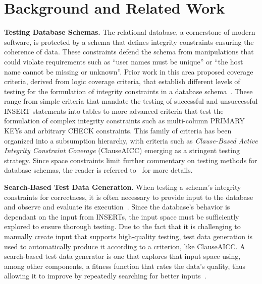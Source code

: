 
\vspace*{-.05in}
\section{Background and Related Work}
\vspace*{-.05in}




{\bf Testing Database Schemas.} The relational database, a cornerstone of modern software, is protected by a schema that
defines integrity constraints ensuring the coherence of data. These constraints defend the schema from manipulations
that could violate requirements such as ``user names must be unique'' or ``the host name cannot be missing or unknown''.
Prior work in this area proposed coverage criteria, derived from logic coverage criteria, that establish different
levels of testing for the formulation of integrity constraints in a database schema~\cite{mcminn2015}. These range from
simple criteria that mandate the testing of successful and unsuccessful INSERT statements into tables to more advanced
criteria that test the formulation of complex integrity constraints such as multi-column PRIMARY KEYs and arbitrary
CHECK constraints. This family of criteria has been organized into a subsumption hierarchy, with criteria such as {\em
Clause-Based Active Integrity Constraint Coverage} (ClauseAICC) emerging as a stringent testing strategy. Since space
constraints limit further commentary on testing methods for database schemas, the reader is referred
to~\cite{mcminn2015} for more details.


{\bf Search-Based Test Data Generation}. When testing a schema's integrity constraints for correctness, it is often
necessary to provide input to the database and observe and evaluate its execution~\cite{kapfhammer2013}.  Since the
database's behavior is dependant on the input from INSERTs, the input space must be sufficiently explored to ensure
thorough testing.  Due to the fact that it is challenging to manually create input that supports high-quality testing,
test data generation is used to automatically produce it according to a criterion, like ClauseAICC. A search-based test
data generator is one that explores that input space using, among other components, a fitness function that rates the
data's quality, thus allowing it to improve by repeatedly searching for better inputs~\cite{mcminn2004a}.

